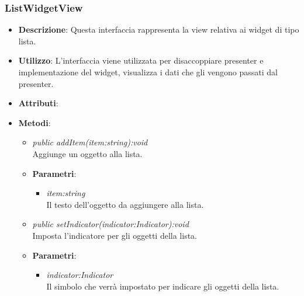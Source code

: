\subsubsection{ListWidgetView}
\begin{itemize}
\item \textbf{Descrizione}: Questa interfaccia rappresenta la view relativa ai widget di tipo lista.
\item \textbf{Utilizzo}: L'interfaccia viene utilizzata per disaccoppiare presenter e implementazione del widget, visualizza i dati che gli vengono passati dal presenter.
\item \textbf{Attributi}:
\item \textbf{Metodi}:
	\begin{itemize}
	\item \textit{public addItem(item:string):void}\\
	Aggiunge un oggetto alla lista.
		\item{\textbf{Parametri}: \begin{itemize}
		\item \textit{item:string}\\
		Il testo dell'oggetto da aggiungere alla lista.
		\end{itemize}}
	\item \textit{public setIndicator(indicator:Indicator):void}\\
	Imposta l'indicatore per gli oggetti della lista.
		\item{\textbf{Parametri}: \begin{itemize}
		\item \textit{indicator:Indicator}\\
		Il simbolo che verrà impostato per indicare gli oggetti della lista.
		\end{itemize}}
	\end{itemize}
\end{itemize}

